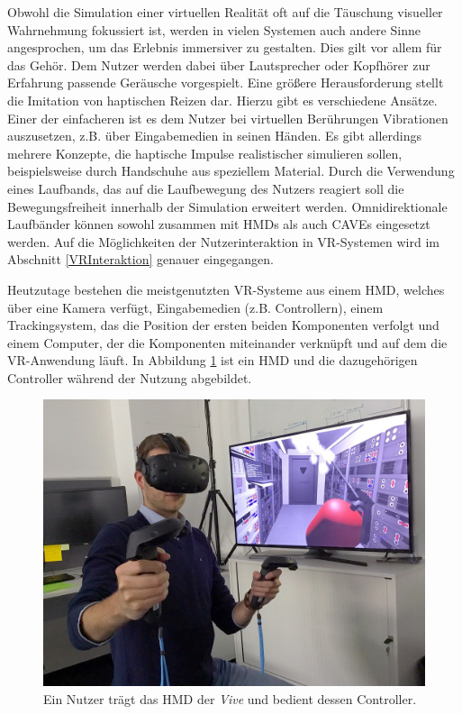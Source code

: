 Obwohl die Simulation einer virtuellen Realität oft auf die Täuschung visueller Wahrnehmung fokussiert ist, werden in vielen Systemen auch andere Sinne angesprochen, um das Erlebnis immersiver zu gestalten. Dies gilt vor allem für das Gehör. Dem Nutzer werden dabei über Lautsprecher oder Kopfhörer zur Erfahrung passende Geräusche vorgespielt.
Eine größere Herausforderung stellt die Imitation von haptischen Reizen dar. Hierzu gibt es verschiedene Ansätze. Einer der einfacheren ist es dem Nutzer bei virtuellen Berührungen Vibrationen auszusetzen, z.B. über Eingabemedien in seinen Händen. Es gibt allerdings mehrere Konzepte, die haptische Impulse realistischer simulieren sollen, beispielsweise durch Handschuhe aus speziellem Material. %
Durch die Verwendung eines Laufbands, das auf die Laufbewegung des Nutzers reagiert soll die Bewegungsfreiheit innerhalb der Simulation erweitert werden. Omnidirektionale Laufbänder können sowohl zusammen mit HMDs als auch CAVEs eingesetzt werden.
Auf die Möglichkeiten der Nutzerinteraktion in VR-Systemen wird im Abschnitt \ref{VRInteraktion} genauer eingegangen.

Heutzutage bestehen die meistgenutzten VR-Systeme aus einem HMD, welches über eine Kamera verfügt, Eingabemedien (z.B. Controllern), einem Trackingsystem, das die Position der ersten beiden Komponenten verfolgt und einem Computer, der die Komponenten miteinander verknüpft und auf dem die VR-Anwendung läuft. 
In Abbildung \ref{img:vive} ist ein HMD und die dazugehörigen Controller während der Nutzung abgebildet.

\begin{figure}[!htb]
	\centering
	\includegraphics[width=0.5\linewidth]{images/vive.jpg}
	\caption{Ein Nutzer trägt das HMD der \textit{Vive} und bedient dessen Controller.}
	\label{img:vive}
\end{figure}
\FloatBarrier

